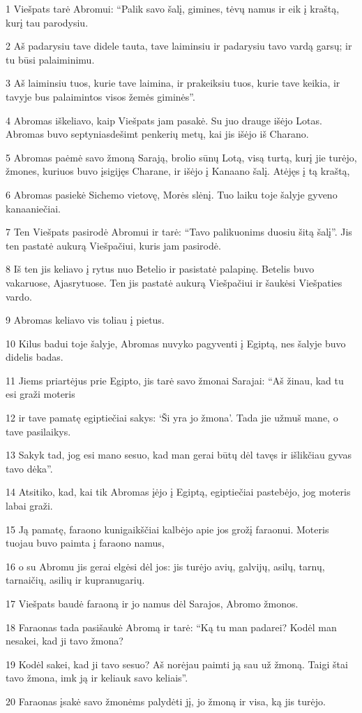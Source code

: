 \par 1 Viešpats tarė Abromui: “Palik savo šalį, gimines, tėvų namus ir eik į kraštą, kurį tau parodysiu. 
\par 2 Aš padarysiu tave didele tauta, tave laiminsiu ir padarysiu tavo vardą garsų; ir tu būsi palaiminimu. 
\par 3 Aš laiminsiu tuos, kurie tave laimina, ir prakeiksiu tuos, kurie tave keikia, ir tavyje bus palaimintos visos žemės giminės”. 
\par 4 Abromas iškeliavo, kaip Viešpats jam pasakė. Su juo drauge išėjo Lotas. Abromas buvo septyniasdešimt penkerių metų, kai jis išėjo iš Charano. 
\par 5 Abromas paėmė savo žmoną Sarają, brolio sūnų Lotą, visą turtą, kurį jie turėjo, žmones, kuriuos buvo įsigijęs Charane, ir išėjo į Kanaano šalį. Atėjęs į tą kraštą, 
\par 6 Abromas pasiekė Sichemo vietovę, Morės slėnį. Tuo laiku toje šalyje gyveno kanaaniečiai. 
\par 7 Ten Viešpats pasirodė Abromui ir tarė: “Tavo palikuonims duosiu šitą šalį”. Jis ten pastatė aukurą Viešpačiui, kuris jam pasirodė. 
\par 8 Iš ten jis keliavo į rytus nuo Betelio ir pasistatė palapinę. Betelis buvo vakaruose, Ajas­rytuose. Ten jis pastatė aukurą Viešpačiui ir šaukėsi Viešpaties vardo. 
\par 9 Abromas keliavo vis toliau į pietus. 
\par 10 Kilus badui toje šalyje, Abromas nuvyko pagyventi į Egiptą, nes šalyje buvo didelis badas. 
\par 11 Jiems priartėjus prie Egipto, jis tarė savo žmonai Sarajai: “Aš žinau, kad tu esi graži moteris 
\par 12 ir tave pamatę egiptiečiai sakys: ‘Ši yra jo žmona’. Tada jie užmuš mane, o tave pasilaikys. 
\par 13 Sakyk tad, jog esi mano sesuo, kad man gerai būtų dėl tavęs ir išlikčiau gyvas tavo dėka”. 
\par 14 Atsitiko, kad, kai tik Abromas įėjo į Egiptą, egiptiečiai pastebėjo, jog moteris labai graži. 
\par 15 Ją pamatę, faraono kunigaikščiai kalbėjo apie jos grožį faraonui. Moteris tuojau buvo paimta į faraono namus, 
\par 16 o su Abromu jis gerai elgėsi dėl jos: jis turėjo avių, galvijų, asilų, tarnų, tarnaičių, asilių ir kupranugarių. 
\par 17 Viešpats baudė faraoną ir jo namus dėl Sarajos, Abromo žmonos. 
\par 18 Faraonas tada pasišaukė Abromą ir tarė: “Ką tu man padarei? Kodėl man nesakei, kad ji tavo žmona? 
\par 19 Kodėl sakei, kad ji tavo sesuo? Aš norėjau paimti ją sau už žmoną. Taigi štai tavo žmona, imk ją ir keliauk savo keliais”. 
\par 20 Faraonas įsakė savo žmonėms palydėti jį, jo žmoną ir visa, ką jis turėjo.



